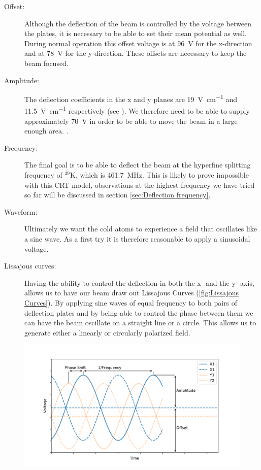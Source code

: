 \begin{description}
	
	\item[Offset:] Although the deflection of the beam is controlled by the voltage between the plates, it is necessary to be able to set their mean potential as well. During normal operation this offset voltage is at \SI{96}{\volt} for the x-direction and at \SI{78}{\volt} for the y-direction. These offsets are necessary to keep the beam focused.  
	\item[Amplitude:] The deflection coefficients in the x and y planes are \SI{19}{\volt\per\centi\meter} and \SI{11.5}{\volt\per\centi\meter} respectively (see \cite{D14363GY123-manual}). We therefore need to be able to supply approximately \SI{70}{\volt} in order to be able to move the beam in a large enough area.  .
	
	\item[Frequency:] The final goal is to be able to deflect the beam at the hyperfine splitting frequency of $^{39}\mathrm{K}$, which is \SI{461.7}{\mega\hertz}. This is likely to prove impossible with this CRT-model, observations at the highest frequency we have tried so far will be discussed in section \cref{sec:Deflection frequency}.
	
	\item[Waveform:] Ultimately we want the cold atoms to experience a field that oscillates like a sine wave. As a first try it is therefore reasonable to apply a sinusoidal voltage.
	
	\item[Lissajous curves:] Having the ability to control the deflection in both the x- and the y- axis, allows us to have our beam draw out Lissajous Curves (\cref{fig:Lissajous Curves}). By applying sine waves of equal frequency to both pairs of deflection plates and by being able to control the phase between them we can have the beam oscillate on a straight line or a circle. This allows us to generate either a linearly or circularly polarized field.
\end{description}

\begin{figure}[ht]
	\centering
	\includegraphics[width=0.7\linewidth]{Chapters/Deflection/VoltageAspects}
	\caption{}
	\label{fig:VoltageAspects}
\end{figure}


